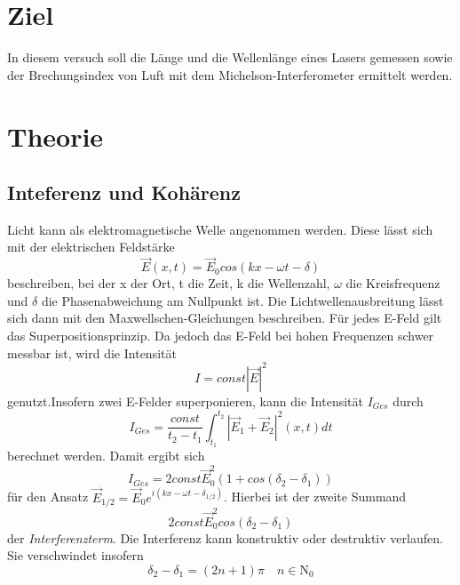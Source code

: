 
\section{Ziel}

In diesem versuch soll die Länge und die Wellenlänge eines Lasers gemessen sowie der Brechungsindex von Luft mit dem Michelson-Interferometer ermittelt werden.

\section{Theorie}

\subsection{Inteferenz und Kohärenz}
Licht kann als elektromagnetische Welle angenommen werden. Diese lässt sich mit der elektrischen Feldstärke 
\begin{equation}
  \vec E(x,t)=\vec E_{0}cos(kx-\omega t-\delta) \nonumber
\end{equation}
beschreiben, bei der x der Ort, t die Zeit, k die Wellenzahl, $\omega$ die Kreisfrequenz und $\delta$ die Phasenabweichung am Nullpunkt ist. Die Lichtwellenausbreitung lässt sich dann mit den Maxwellschen-Gleichungen beschreiben. Für jedes E-Feld gilt das Superpositionsprinzip. Da jedoch das E-Feld bei hohen Frequenzen schwer messbar ist, wird die Intensität 
\begin{equation}
  I=const|\vec E|^2 \nonumber
\end{equation}
genutzt.Insofern zwei E-Felder superponieren, kann die Intensität $I_{Ges}$ durch
\begin{equation}
  I_{Ges}=\frac{const}{t_{2}-t_{1}} \int^{t_{2}}_{t_{1}} |\vec E_{1}+\vec E_{2}|^2 (x,t)dt \nonumber
\end{equation}
berechnet werden. Damit ergibt sich 
\begin{equation}
  I_{Ges}=2const\vec E_{0}^2 (1+cos(\delta_{2}-\delta_{1})) \nonumber
\end{equation}
für den Ansatz $\vec E_{1/2}=\vec E_{0}e^{i(kx-\omega t -\delta_{1/2})}$. Hierbei ist der zweite Summand
\begin{equation}
  2const\vec E_{0}^2 cos(\delta_{2}-\delta_{1}) \nonumber
\end{equation}
der \textit{Interferenzterm}.
Die Interferenz kann konstruktiv oder destruktiv verlaufen. Sie verschwindet insofern 
\begin{equation}
  \delta_2 - \delta_1 = (2n+1)\pi \quad n \in \mathrm{N_{0}} \nonumber
\end{equation}
